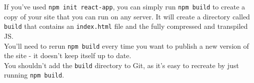 \label{deployment}

If you've used \texttt{npm init react-app}, you can simply run \texttt{npm build} to create a copy of your site that you can run on any server. It will create a directory called \texttt{build} that contains an \texttt{index.html} file and the fully compressed and transpiled JS.
\\

You'll need to rerun \texttt{npm build} every time you want to publish a new version of the site - it doesn't keep itself up to date.
\\

You shouldn't add the \texttt{build} directory to Git, as it's easy to recreate by just running \texttt{npm build}.
